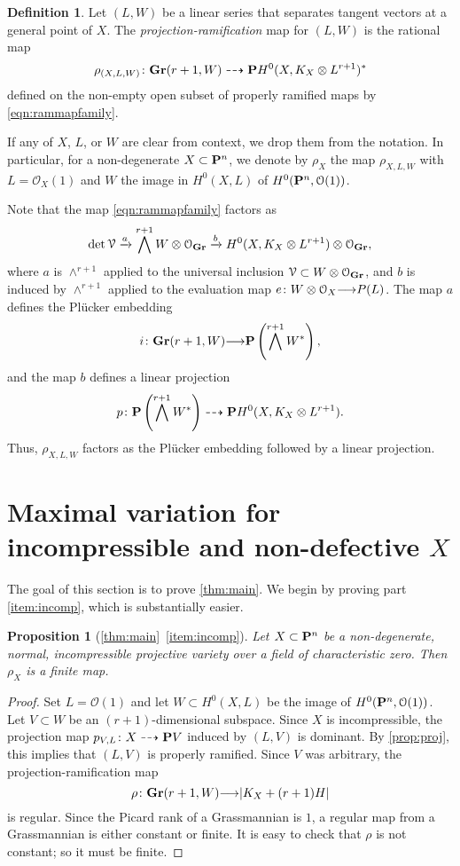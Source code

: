 \documentclass[11pt,reqno]{amsart}
\theoremstyle{plain}
\newtheorem{proposition}[theorem]{Proposition}
\theoremstyle{definition}
\newtheorem{definition}[theorem]{Definition}
\theoremstyle{remark}
\numberwithin{equation}{section}
\renewcommand{\to}{{\longrightarrow}}
\numberwithin{equation}{section}
\renewcommand{\O}{\mathcal O}
\begin{document}
\begin{definition}
  \label{def:ProjectionRamification}
  Let $(L, W)$ be a linear series that separates tangent vectors at a general point of $X$.
  The \emph{projection-ramification} map for $(L,W)$ is the rational map
  \[
    \rho_{(X,L,W)} \from \Gr(r+1, W) \dashrightarrow \P H^0(X, K_X \otimes L^{r+1})^*
  \]
  defined on the non-empty open subset of properly ramified maps by \eqref{eqn:rammapfamily}.
\end{definition}
If any of $X$, $L$, or $W$ are clear from context, we drop them from the notation.
In particular, for a non-degenerate $X \subset \P^n$, we denote by $\rho_X$ the map $\rho_{X,L,W}$  with $L = \O_X(1)$ and $W$ the image in $H^0(X, L)$ of $H^0(\P^n, \O(1))$.

Note that the map \eqref{eqn:rammapfamily} factors as
\[ \det \mathcal V \xrightarrow{a} \bigwedge^{r+1} W \otimes \O_{\Gr} \xrightarrow{b} H^0(X, K_X \otimes L^{r+1}) \otimes \O_{\Gr},\]
where $a$ is $\wedge^{r+1}$ applied to the universal inclusion $\mathcal V \subset W \otimes \O_{\Gr}$, and $b$ is induced by $\wedge^{r+1}$ applied to the evaluation map $e \from W \otimes \O_{X} \to P(L)$.
The map $a$ defines the Pl\"ucker embedding
\[ i \from \Gr(r+1, W) \to \P \left(\bigwedge^{r+1}W^*\right),\]
and the map $b$ defines a linear projection
\[ p \from \P \left(\bigwedge^{r+1}W^*\right) \dashrightarrow \P H^0(X, K_X \otimes L^{r+1}).\]
Thus, $\rho_{X,L,W}$ factors as the Pl\"ucker embedding followed by a linear projection.

\section{Maximal variation for incompressible and non-defective $X$}
\label{sec:proof_of_theorem:main}
The goal of this section is to prove \autoref{thm:main}.
We begin by proving part \eqref{item:incomp}, which is substantially easier.
\begin{proposition}[\autoref{thm:main}~\eqref{item:incomp}]
  \label{prop:incompress}
  Let $X \subset \P^n$ be a non-degenerate, normal, incompressible projective variety over a field of characteristic zero.
  Then $\rho_X$ is a finite map.
\end{proposition}
\begin{proof}
  Set $L = \O(1)$ and let $W \subset H^0(X, L)$ be the image of $H^0(\P^n, \O(1))$.
  Let $V \subset W$ be an $(r+1)$-dimensional subspace.
  Since $X$ is incompressible, the projection map $p_{V,L} \from X \dashrightarrow \P V$ induced by $(L, V)$ is dominant.
  By \autoref{prop:proj}, this implies that $(L, V)$ is properly ramified.
  Since $V$ was arbitrary, the projection-ramification map 
  \[ \rho \from \Gr(r+1, W) \to |K_X + (r+1) H|\]
  is regular.
  Since the Picard rank of a Grassmannian is $1$, a regular map from a Grassmannian is either constant or finite.
  It is easy to check that $\rho$ is not constant; so it must be finite.
\end{proof}
\end{document}
